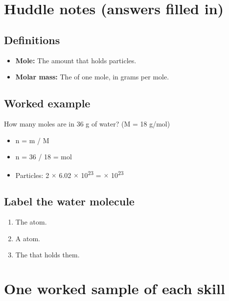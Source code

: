 \documentclass[11pt]{article}
\begin{document}
\section*{Huddle notes (answers filled in)}
\subsection*{Definitions}\begin{itemize}
\item \textbf{Mole:} The amount that holds  particles.
\item \textbf{Molar mass:} The  of one mole, in grams per mole.
\end{itemize}
\subsection*{Worked example}
How many moles are in 36 g of water? (M = 18 g/mol)\\
\begin{itemize}
\item n = m / M
\item n = 36 / 18 =  mol
\item Particles: 2 $\times$ 6.02 $\times$ 10\textsuperscript{2}\textsuperscript{3} =  $\times$ 10\textsuperscript{2}\textsuperscript{3}
\end{itemize}
\subsection*{Label the water molecule}
\begin{enumerate}
\item The  atom.
\item A  atom.
\item The  that holds them.
\end{enumerate}
\section*{One worked sample of each skill}
\end{document}
